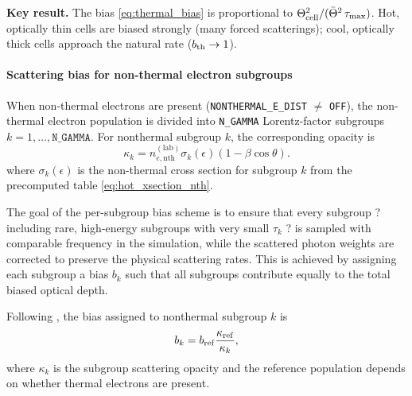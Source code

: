 \documentclass[12pt,a4paper]{article}
\newcommand{\code}[1]{\texttt{#1}}
\newcommand{\raikou}{\textsc{Raikou}}
\newenvironment{keyresult}{%
	\begin{framed}\noindent\textbf{Key result.}\quad}
	{\end{framed}}
\begin{document}
\begin{keyresult}
	The bias \eqref{eq:thermal_bias} is proportional to $\Theta_{\rm cell}^2 /
	(\bar{\Theta}^2\,\tau_{\max})$.  Hot, optically thin cells are biased
	strongly (many forced scatterings); cool, optically thick cells approach
	the natural rate ($b_{\rm th} \to 1$).
\end{keyresult}

\paragraph{Scattering bias for non-thermal electron subgroups}
\label{sec:nonthermal_bias}

When non-thermal electrons are present (\code{NONTHERMAL\_E\_DIST}
$\ne$ \code{OFF}), the non-thermal electron population is divided into
\code{N\_GAMMA} Lorentz-factor subgroups $k = 1,\ldots,\code{N\_GAMMA}$.
For nonthermal subgroup $k$, the corresponding opacity is
\begin{equation}
	\kappa_k
	=
	n_{e,\mathrm{nth}}^{(\mathrm{lab})}
	\sigma_k(\epsilon)
	\left(1-\beta\cos\theta\right).
	\label{eq:kappa_nth_k}
\end{equation}
where $\sigma_k(\epsilon)$ is the non-thermal cross section for subgroup
$k$ from the precomputed table \eqref{eq:hot_xsection_nth}.

The goal of the per-subgroup bias scheme is to ensure that every
subgroup ? including rare, high-energy subgroups with very small $\tau_k$
? is sampled with comparable frequency in the simulation, while the
scattered photon weights are corrected to preserve the physical scattering
rates.  This is achieved by assigning each subgroup a bias $b_k$ such that
all subgroups contribute equally to the total biased optical depth.

Following \citet[\raikou{} Eq.~48]{kawashima2023}, the bias assigned to
nonthermal subgroup $k$ is
\begin{equation}
	b_k
	=
	b_{\rm ref}
	\frac{\kappa_{\rm ref}}{\kappa_k},
	\label{eq:nonthermal_bias}
\end{equation}
where $\kappa_k$ is the subgroup scattering opacity and the reference
population depends on whether thermal electrons are present.
\end{document}
